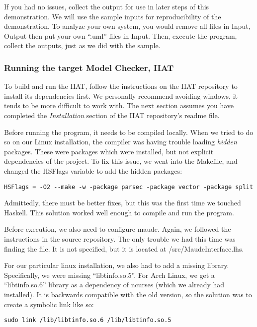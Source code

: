 If you had no issues, collect the output for use in later steps of this demonstration.
We will use the sample inputs for reproducibility of the demonstration.
To analyze your own system, you would remove all files in Input, Output then put your own ``.uml'' files in Input.
Then, execute the program, collect the outputs, just as we did with the sample.

\subsubsection{Running the target Model Checker, IIAT}\label{subsubsec:iiat-run}
To build and run the IIAT, follow the instructions on the IIAT repository to install its dependencies first. %
We personally recommend avoiding windows, it tends to be more difficult to work with.
The next section assumes you have completed the \textit{Installation} section of the IIAT repository's readme file.

Before running the program, it needs to be compiled locally.
When we tried to do so on our Linux installation, the compiler was having trouble loading \textit{hidden} packages.
These were packages which were installed, but not explicit dependencies of the project.
To fix this issue, we went into the Makefile, and changed the HSFlags variable to add the hidden packages:
\begin{verbatim}HSFlags = -O2 --make -w -package parsec -package vector -package split\end{verbatim}
Admittedly, there must be better fixes, but this was the first time we touched Haskell.
This solution worked well enough to compile and run the program.

Before execution, we also need to configure maude.
Again, we followed the instructions in the source repository.
The only trouble we had this time was finding the file.
It is not specified, but it is located at /src/MaudeInterface.lhs.

For our particular linux installation, we also had to add a missing library.
Specifically, we were missing ``libtinfo.so.5''.
For Arch Linux, we get a ``libtinfo.so.6'' library as a dependency of ncurses (which we already had installed).
It is backwards compatible with the old version, so the solution was to create a symbolic link like so:
\begin{verbatim}sudo link /lib/libtinfo.so.6 /lib/libtinfo.so.5\end{verbatim}

